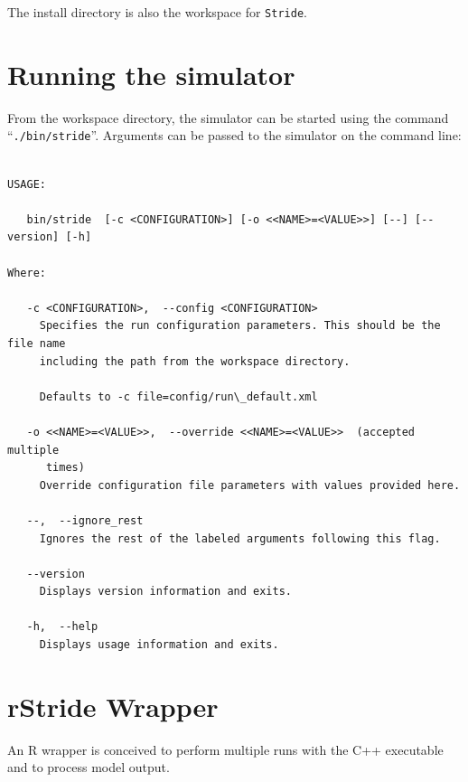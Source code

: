 The install directory is also the workspace for \texttt{Stride}. 

\newpage
\section{Running the simulator}

From the workspace directory, the simulator can be started  using the command \mbox{``\texttt{./bin/stride}''}. Arguments can be passed to the simulator on the command line:
\begin{verbatim}

USAGE: 
 
   bin/stride  [-c <CONFIGURATION>] [-o <<NAME>=<VALUE>>] [--] [--version] [-h]
               
Where: 
 
   -c <CONFIGURATION>,  --config <CONFIGURATION>
     Specifies the run configuration parameters. This should be the file name
     including the path from the workspace directory.
 
     Defaults to -c file=config/run\_default.xml
 
   -o <<NAME>=<VALUE>>,  --override <<NAME>=<VALUE>>  (accepted multiple
      times)
     Override configuration file parameters with values provided here.
 
   --,  --ignore_rest
     Ignores the rest of the labeled arguments following this flag.
 
   --version
     Displays version information and exits.
 
   -h,  --help
     Displays usage information and exits.

\end{verbatim}



\section{rStride Wrapper}
An R wrapper is conceived to perform multiple runs with the C++ executable and to process model output.

